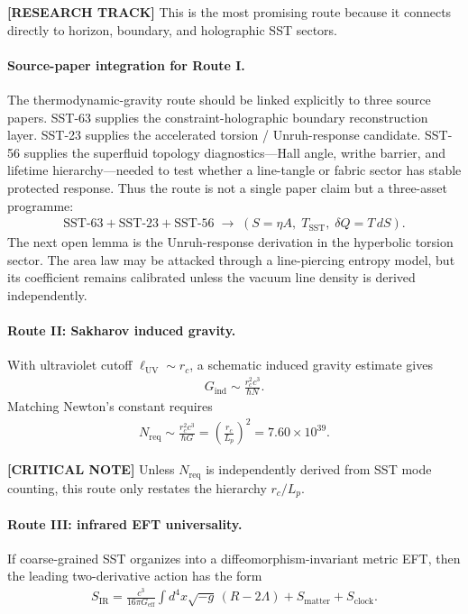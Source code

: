 \textbf{[RESEARCH TRACK]} This is the most promising route because it connects
directly to horizon, boundary, and holographic SST sectors.


\paragraph{Source-paper integration for Route I.}
The thermodynamic-gravity route should be linked explicitly to three source
papers.  SST-63 supplies the constraint-holographic boundary reconstruction
layer.  SST-23 supplies the accelerated torsion / Unruh-response candidate.
SST-56 supplies the superfluid topology diagnostics---Hall angle, writhe
barrier, and lifetime hierarchy---needed to test whether a line-tangle or
fabric sector has stable protected response.  Thus the route is not a single
paper claim but a three-asset programme:
\begin{align}
    \boxed{
    \mathrm{SST\mbox{-}63}
    +
    \mathrm{SST\mbox{-}23}
    +
    \mathrm{SST\mbox{-}56}
    \;\longrightarrow\;
    \left(S=\eta A,\;T_{\mathrm{SST}},\;\delta Q=T\,dS\right)
    } .
    \label{eq:rt_63_23_56_thermo_route}
\end{align}
The next open lemma is the Unruh-response derivation in the hyperbolic
torsion sector.  The area law may be attacked through a line-piercing entropy
model, but its coefficient remains calibrated unless the vacuum line density is
derived independently.


\paragraph{Route II: Sakharov induced gravity.}
With ultraviolet cutoff \(\ell_{\mathrm{UV}}\sim r_c\), a schematic induced
gravity estimate gives \cite{Sakharov1967}
\begin{align}
    G_{\mathrm{ind}}
    \sim
    \frac{r_c^2 c^3}{\hbar N}.
\end{align}
Matching Newton's constant requires
\begin{align}
    N_{\mathrm{req}}
    \sim
    \frac{r_c^2 c^3}{\hbar G}
    =
    \left(\frac{r_c}{L_p}\right)^2
    =
    7.60\times10^{39}.
\end{align}

\textbf{[CRITICAL NOTE]} Unless \(N_{\mathrm{req}}\) is independently derived
from SST mode counting, this route only restates the hierarchy
\(r_c/L_p\).

\paragraph{Route III: infrared EFT universality.}
If coarse-grained SST organizes into a diffeomorphism-invariant metric EFT,
then the leading two-derivative action has the form
\begin{align}
    S_{\mathrm{IR}}
    =
    \frac{c^3}{16\pi G_{\mathrm{eff}}}
    \int d^4x \sqrt{-g}\,
    \left(R-2\Lambda\right)
    + S_{\mathrm{matter}}
    + S_{\mathrm{clock}} .
\end{align}

